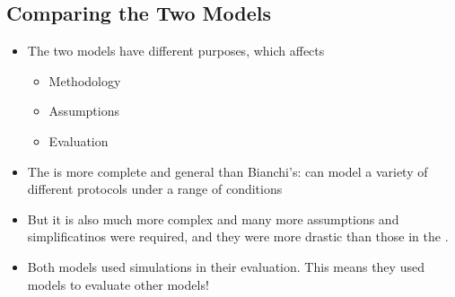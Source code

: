 \subsection{Comparing the Two Models}\label{subsec:Comparing_CSMA_Models}
\begin{itemize}[noitemsep]
\item The two models have different purposes, which affects
  \begin{itemize}[noitemsep]
  \item Methodology
  \item Assumptions
  \item Evaluation
\end{itemize}

\item The  is more complete and general than Bianchi’s: can model a variety of different protocols under a range of conditions
\item But it is also much more complex and many more assumptions and simplificatinos were required, and they were more drastic than those in the .
\item Both models used simulations in their evaluation. This means they used models to evaluate other models!
\end{itemize}

